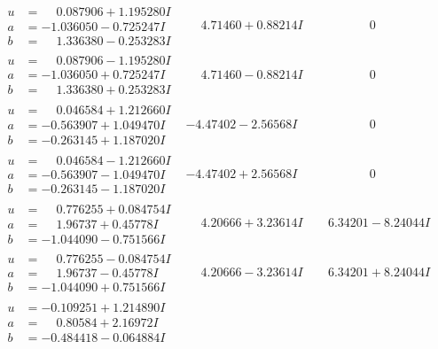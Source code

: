 \documentclass[1p]{elsarticle_modified}
\theoremstyle{definition}
\begin{document}
$$\begin{array}{c|c|c}
\begin{aligned}
u &= \phantom{-}0.087906 + 1.195280 I \\
a &= -1.036050 - 0.725247 I \\
b &= \phantom{-}1.336380 - 0.253283 I\end{aligned}
 & \phantom{-}4.71460 + 0.88214 I & \phantom{-0.000000 } 0 \\ \hline\begin{aligned}
u &= \phantom{-}0.087906 - 1.195280 I \\
a &= -1.036050 + 0.725247 I \\
b &= \phantom{-}1.336380 + 0.253283 I\end{aligned}
 & \phantom{-}4.71460 - 0.88214 I & \phantom{-0.000000 } 0 \\ \hline\begin{aligned}
u &= \phantom{-}0.046584 + 1.212660 I \\
a &= -0.563907 + 1.049470 I \\
b &= -0.263145 + 1.187020 I\end{aligned}
 & -4.47402 - 2.56568 I & \phantom{-0.000000 } 0 \\ \hline\begin{aligned}
u &= \phantom{-}0.046584 - 1.212660 I \\
a &= -0.563907 - 1.049470 I \\
b &= -0.263145 - 1.187020 I\end{aligned}
 & -4.47402 + 2.56568 I & \phantom{-0.000000 } 0 \\ \hline\begin{aligned}
u &= \phantom{-}0.776255 + 0.084754 I \\
a &= \phantom{-}1.96737 + 0.45778 I \\
b &= -1.044090 - 0.751566 I\end{aligned}
 & \phantom{-}4.20666 + 3.23614 I & \phantom{-}6.34201 - 8.24044 I \\ \hline\begin{aligned}
u &= \phantom{-}0.776255 - 0.084754 I \\
a &= \phantom{-}1.96737 - 0.45778 I \\
b &= -1.044090 + 0.751566 I\end{aligned}
 & \phantom{-}4.20666 - 3.23614 I & \phantom{-}6.34201 + 8.24044 I \\ \hline\begin{aligned}
u &= -0.109251 + 1.214890 I \\
a &= \phantom{-}0.80584 + 2.16972 I \\
b &= -0.484418 - 0.064884 I\end{aligned}

\end{array}$$
\end{document}
